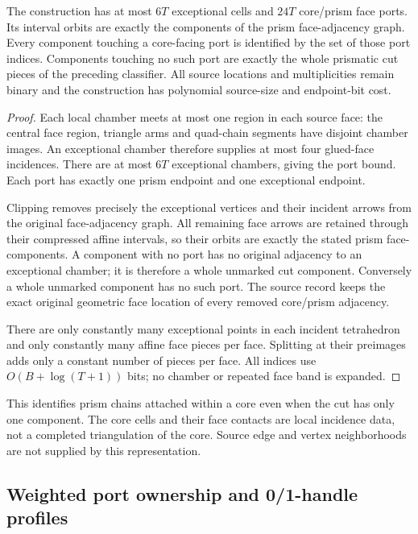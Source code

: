 \begin{proposition}
The construction has at most $6T$ exceptional cells and $24T$ core/prism
face ports. Its interval orbits are exactly the components of the prism
face-adjacency graph. Every component touching a core-facing port is
identified by the set of those port indices. Components touching no such
port are exactly the whole prismatic cut pieces of the preceding classifier.
All source locations and multiplicities remain binary and the construction
has polynomial source-size and endpoint-bit cost.
\end{proposition}
\begin{proof}
Each local chamber meets at most one region in each source face: the central
face region, triangle arms and quad-chain segments have disjoint chamber
images. An exceptional chamber therefore supplies at most four glued-face
incidences. There are at most $6T$ exceptional chambers, giving the port
bound. Each port has exactly one prism endpoint and one exceptional endpoint.

Clipping removes precisely the exceptional vertices and their incident
arrows from the original face-adjacency graph. All remaining face arrows
are retained through their compressed affine intervals, so their orbits
are exactly the stated prism face-components. A component with no port
has no original adjacency to an exceptional chamber; it is therefore a
whole unmarked cut component. Conversely a whole unmarked component has
no such port. The source record keeps the exact original geometric face
location of every removed core/prism adjacency.

There are only constantly many exceptional points in each incident
tetrahedron and only constantly many affine face pieces per face. Splitting
at their preimages adds only a constant number of pieces per face.
All indices use $O(B+\log(T+1))$ bits; no chamber or repeated face band is
expanded.
\end{proof}

This identifies prism chains attached within a core even when the cut has
only one component. The core cells and their face contacts are local
incidence data, not a completed triangulation of the core. Source edge and
vertex neighborhoods are not supplied by this representation.

\subsection{Weighted port ownership and 0/1-handle profiles}

